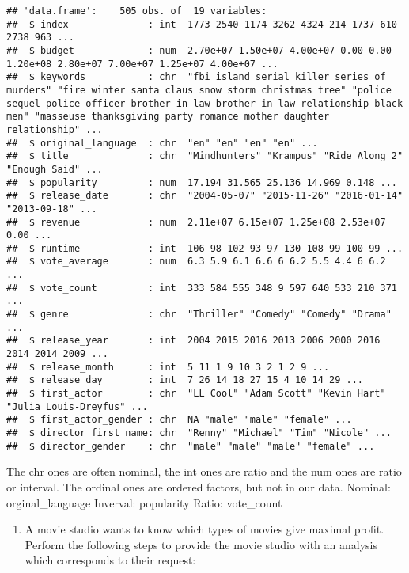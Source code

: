 \documentclass[
]{article}
\providecommand{\tightlist}{%
  \setlength{\itemsep}{0pt}\setlength{\parskip}{0pt}}
\begin{document}
\begin{verbatim}
## 'data.frame':    505 obs. of  19 variables:
##  $ index              : int  1773 2540 1174 3262 4324 214 1737 610 2738 963 ...
##  $ budget             : num  2.70e+07 1.50e+07 4.00e+07 0.00 0.00 1.20e+08 2.80e+07 7.00e+07 1.25e+07 4.00e+07 ...
##  $ keywords           : chr  "fbi island serial killer series of murders" "fire winter santa claus snow storm christmas tree" "police sequel police officer brother-in-law brother-in-law relationship black men" "masseuse thanksgiving party romance mother daughter relationship" ...
##  $ original_language  : chr  "en" "en" "en" "en" ...
##  $ title              : chr  "Mindhunters" "Krampus" "Ride Along 2" "Enough Said" ...
##  $ popularity         : num  17.194 31.565 25.136 14.969 0.148 ...
##  $ release_date       : chr  "2004-05-07" "2015-11-26" "2016-01-14" "2013-09-18" ...
##  $ revenue            : num  2.11e+07 6.15e+07 1.25e+08 2.53e+07 0.00 ...
##  $ runtime            : int  106 98 102 93 97 130 108 99 100 99 ...
##  $ vote_average       : num  6.3 5.9 6.1 6.6 6 6.2 5.5 4.4 6 6.2 ...
##  $ vote_count         : int  333 584 555 348 9 597 640 533 210 371 ...
##  $ genre              : chr  "Thriller" "Comedy" "Comedy" "Drama" ...
##  $ release_year       : int  2004 2015 2016 2013 2006 2000 2016 2014 2014 2009 ...
##  $ release_month      : int  5 11 1 9 10 3 2 1 2 9 ...
##  $ release_day        : int  7 26 14 18 27 15 4 10 14 29 ...
##  $ first_actor        : chr  "LL Cool" "Adam Scott" "Kevin Hart" "Julia Louis-Dreyfus" ...
##  $ first_actor_gender : chr  NA "male" "male" "female" ...
##  $ director_first_name: chr  "Renny" "Michael" "Tim" "Nicole" ...
##  $ director_gender    : chr  "male" "male" "male" "female" ...
\end{verbatim}

The chr ones are often nominal, the int ones are ratio and the num ones
are ratio or interval. The ordinal ones are ordered factors, but not in
our data. Nominal: orginal\_language Inverval: popularity Ratio:
vote\_count

\begin{enumerate}
\def\labelenumi{\arabic{enumi}.}
\setcounter{enumi}{2}
\tightlist
\item
  A movie studio wants to know which types of movies give maximal
  profit. Perform the following steps to provide the movie studio with
  an analysis which corresponds to their request:
\end{enumerate}
\end{document}
